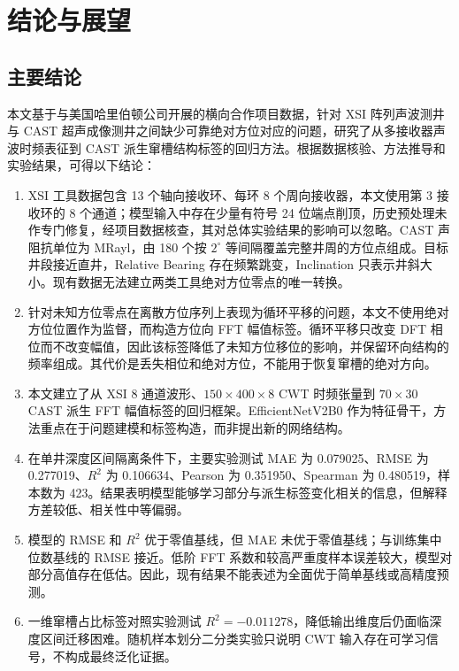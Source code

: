 \chapter{结论与展望}

\section{主要结论}

本文基于与美国哈里伯顿公司开展的横向合作项目数据，针对 XSI 阵列声波测井与 CAST 超声成像测井之间缺少可靠绝对方位对应的问题，研究了从多接收器声波时频表征到 CAST 派生窜槽结构标签的回归方法。根据数据核验、方法推导和实验结果，可得以下结论：

\begin{enumerate}
  \item XSI 工具数据包含 13 个轴向接收环、每环 8 个周向接收器，本文使用第 3 接收环的 8 个通道；模型输入中存在少量有符号 24 位端点削顶，历史预处理未作专门修复，经项目数据核查，其对总体实验结果的影响可以忽略。CAST 声阻抗单位为 MRayl，由 180 个按 $2^\circ$ 等间隔覆盖完整井周的方位点组成。目标井段接近直井，Relative Bearing 存在频繁跳变，Inclination 只表示井斜大小。现有数据无法建立两类工具绝对方位零点的唯一转换。
  \item 针对未知方位零点在离散方位序列上表现为循环平移的问题，本文不使用绝对方位位置作为监督，而构造方位向 FFT 幅值标签。循环平移只改变 DFT 相位而不改变幅值，因此该标签降低了未知方位移位的影响，并保留环向结构的频率组成。其代价是丢失相位和绝对方位，不能用于恢复窜槽的绝对方向。
  \item 本文建立了从 XSI 8 通道波形、$150\times400\times8$ CWT 时频张量到 $70\times30$ CAST 派生 FFT 幅值标签的回归框架。EfficientNetV2B0 作为特征骨干，方法重点在于问题建模和标签构造，而非提出新的网络结构。
  \item 在单井深度区间隔离条件下，主要实验测试 MAE 为 0.079025、RMSE 为 0.277019、$R^2$ 为 0.106634、Pearson 为 0.351950、Spearman 为 0.480519，样本数为 423。结果表明模型能够学习部分与派生标签变化相关的信息，但解释方差较低、相关性中等偏弱。
  \item 模型的 RMSE 和 $R^2$ 优于零值基线，但 MAE 未优于零值基线；与训练集中位数基线的 RMSE 接近。低阶 FFT 系数和较高严重度样本误差较大，模型对部分高值存在低估。因此，现有结果不能表述为全面优于简单基线或高精度预测。
  \item 一维窜槽占比标签对照实验测试 $R^2=-0.011278$，降低输出维度后仍面临深度区间迁移困难。随机样本划分二分类实验只说明 CWT 输入存在可学习信号，不构成最终泛化证据。
\end{enumerate}

